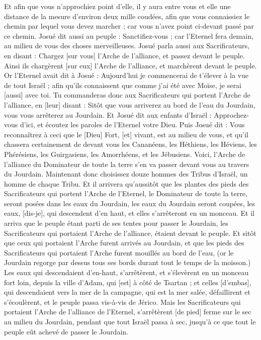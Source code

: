\begin{multicols}{2}
Et afin que vous n'approchiez point d'elle, il y aura entre vous et elle une distance de la mesure d'environ deux mille coudées, afin que vous connaissiez le chemin par lequel vous devez marcher ; car vous n'avez point ci-devant passé par ce chemin.
Josué dit aussi au peuple : Sanctifiez-vous ; car l'Eternel fera demain, au milieu de vous des choses merveilleuses.
Josué parla aussi aux Sacrificateurs, en disant : Chargez [sur vous] l'Arche de l'alliance, et passez devant le peuple. Ainsi ils chargèrent [sur eux] l'Arche de l'alliance, et marchèrent devant le peuple.
Or l'Eternel avait dit à Josué : Aujourd'hui je commencerai de t'élever à la vue de tout Israël ; afin qu'ils connaissent que comme j'ai été avec Moïse, je serai [aussi] avec toi.
Tu commanderas donc aux Sacrificateurs qui portent l'Arche de l'alliance, en [leur] disant : Sitôt que vous arriverez au bord de l'eau du Jourdain, vous vous arrêterez au Jourdain.
Et Josué dit aux enfants d'Israël : Approchez-vous d'ici, et écoutez les paroles de l'Eternel votre Dieu.
Puis Josué dit : Vous reconnaîtrez à ceci que le [Dieu] Fort, [et] vivant, est au milieu de vous, et qu'il chassera certainement de devant vous les Cananéens, les Héthiens, les Héviens, les Phérésiens, les Guirgasiens, les Amorrhéens, et les Jébusiens.
Voici, l'Arche de l'alliance du Dominateur de toute la terre s'en va passer devant vous au travers du Jourdain.
Maintenant donc choisissez douze hommes des Tribus d'Israël, un homme de chaque Tribu.
Et il arrivera qu'aussitôt que les plantes des pieds des Sacrificateurs qui portent l'Arche de l'Eternel, le Dominateur de toute la terre, seront posées dans les eaux du Jourdain, les eaux du Jourdain seront coupées, les eaux, [dis-je], qui descendent d'en haut, et elles s'arrêteront en un monceau.
Et il arriva que le peuple étant parti de ses tentes pour passer le Jourdain, les Sacrificateurs qui portaient l'Arche de l'alliance, étaient devant le peuple.
Et sitôt que ceux qui portaient l'Arche furent arrivés au Jourdain, et que les pieds des Sacrificateurs qui portaient l'Arche furent mouillés au bord de l'eau, (or le Jourdain regorge par dessus tous ses bords durant tout le temps de la moisson.)
Les eaux qui descendaient d'en-haut, s'arrêtèrent, et s'élevèrent en un monceau fort loin, depuis la ville d'Adam, qui [est] à côté de Tsartan ; et celles [d'embas], qui descendaient vers la mer de la campagne, qui est la mer salée, défaillirent et s'écoulèrent, et le peuple passa vis-à-vis de Jérico.
Mais les Sacrificateurs qui portaient l'Arche de l'alliance de l'Eternel, s'arrêtèrent [de pied] ferme sur le sec au milieu du Jourdain, pendant que tout Israël passa à sec, jusqu'à ce que tout le peuple eût achevé de passer le Jourdain.

\end{multicols}
